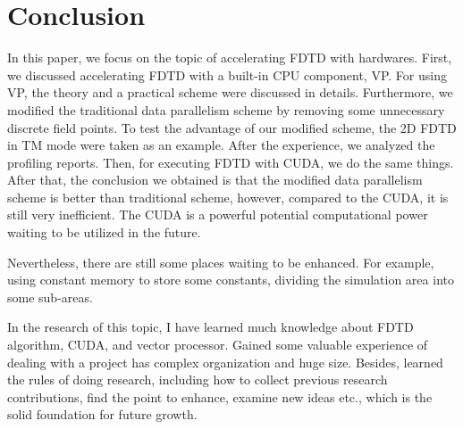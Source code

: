 
\chapter{Conclusion}

In this paper, we focus on the topic of accelerating FDTD with hardwares. First, we discussed accelerating FDTD with a built-in CPU component, VP. For using VP, the theory and a practical scheme were discussed in details. Furthermore, we modified the traditional data parallelism scheme by removing some unnecessary discrete field points. To test the advantage of our modified scheme, the 2D FDTD in TM mode were taken as an example. After the experience, we analyzed the profiling reports. Then, for executing FDTD with CUDA, we do the same things. After that, the conclusion we obtained is that the modified data parallelism scheme is better than traditional scheme, however, compared to the CUDA, it is still very inefficient. The CUDA is a powerful potential computational power waiting to be utilized in the future.

Nevertheless, there are still some places waiting to be enhanced. For example, using constant memory to store some constants, dividing the simulation area into some sub-areas.

In the research of this topic, I have learned much knowledge about FDTD algorithm, CUDA, and vector processor. Gained some valuable experience of dealing with a project has complex organization and huge size. Besides, learned the rules of doing research, including how to collect previous research contributions, find the point to enhance, examine new ideas etc., which is the solid foundation for future growth.
